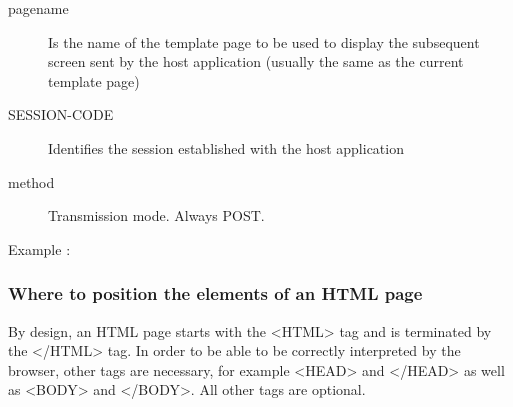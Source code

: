 \documentclass[letterpaper,10pt,english]{sphinxmanual}
\begin{document}
\begin{sphinxVerbatim}[commandchars=\\\{\}]
\end{sphinxVerbatim}
\begin{description}
\item[{pagename}] \leavevmode
Is the name of the template page to be used to display the subsequent screen sent by the host application (usually the same as the current template page)

\item[{SESSION-CODE}] \leavevmode
Identifies the session established with the host application

\item[{method}] \leavevmode
Transmission mode. Always POST.

\end{description}

Example :

\begin{sphinxVerbatim}[commandchars=\\\{\}]
   
\end{sphinxVerbatim}


\subsubsection{Where to position the elements of an HTML page}
\label{\detokenize{User_Guide:where-to-position-the-elements-of-an-html-page}}
By design, an HTML page starts with the \textless{}HTML\textgreater{} tag and is terminated by the \textless{}/HTML\textgreater{} tag. In order to be able to be correctly interpreted by the browser, other tags are necessary, for example \textless{}HEAD\textgreater{} and \textless{}/HEAD\textgreater{} as well as \textless{}BODY\textgreater{} and \textless{}/BODY\textgreater{}. All other tags are optional.
\end{document}
